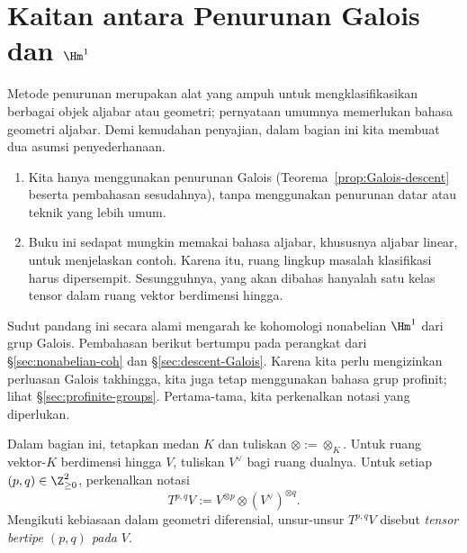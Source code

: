 
\section{Kaitan antara Penurunan Galois dan
\texorpdfstring{$\Hm^1$}{H1}}\label{sec:Galois-H1}
\hypertarget{o014.aljabr2.chapter7.galois-descent-h1}{ }
Metode penurunan merupakan alat yang ampuh untuk mengklasifikasikan berbagai
objek aljabar atau geometri; pernyataan umumnya memerlukan bahasa geometri
aljabar. Demi kemudahan penyajian, dalam bagian ini kita membuat dua asumsi
penyederhanaan.
\begin{enumerate}
	\item Kita hanya menggunakan penurunan Galois
	(Teorema~\ref{prop:Galois-descent} beserta pembahasan sesudahnya), tanpa
	menggunakan penurunan datar atau teknik yang lebih umum.
	\item Buku ini sedapat mungkin memakai bahasa aljabar, khususnya aljabar
	linear, untuk menjelaskan contoh. Karena itu, ruang lingkup masalah
	klasifikasi harus dipersempit. Sesungguhnya, yang akan dibahas hanyalah
	satu kelas tensor dalam ruang vektor berdimensi hingga.
\end{enumerate}

Sudut pandang ini secara alami mengarah ke kohomologi nonabelian
$\Hm^1$ dari grup Galois. Pembahasan berikut bertumpu pada perangkat dari
\S\ref{sec:nonabelian-coh} dan \S\ref{sec:descent-Galois}. Karena kita perlu
mengizinkan perluasan Galois takhingga, kita juga tetap menggunakan bahasa
grup profinit; lihat \S\ref{sec:profinite-groups}. Pertama-tama, kita
perkenalkan notasi yang diperlukan.

\begin{convention}
	Dalam bagian ini, tetapkan medan $K$ dan tuliskan
	$\otimes:=\otimes_K$. Untuk ruang vektor-$K$ berdimensi hingga $V$,
	tuliskan $V^\vee$ bagi ruang dualnya. Untuk setiap
	$(p,q)\in\Z_{\geq0}^2$, perkenalkan notasi
	\[
	T^{p,q}V:=V^{\otimes p}\otimes(V^\vee)^{\otimes q}.
	\]
	Mengikuti kebiasaan dalam geometri diferensial, unsur-unsur
	$T^{p,q}V$ disebut \emph{tensor bertipe $(p,q)$ pada $V$}.
\end{convention}

